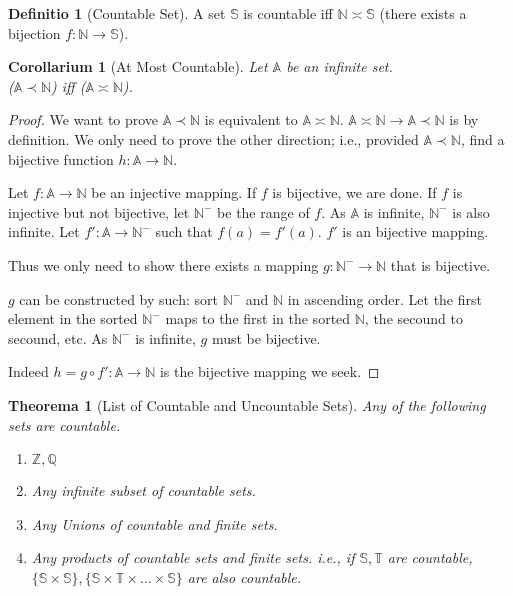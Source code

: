 \documentclass[12pt, a4paper]{report}
\newtheorem{theorem}{Theorema}[section]
\newtheorem{corollary}{Corollarium}[section]
\theoremstyle{definition}
\newtheorem{definition}{Definitio}[section]
\theoremstyle{definition}
\theoremstyle{remark}
\begin{document}
\begin{definition}[Countable Set]
	A set $\mathbb{S}$ is countable iff $\mathbb{N} \asymp \mathbb{S}$ (there exists a bijection $f:\mathbb{N} \rightarrow \mathbb{S}$).
\end{definition}

\begin{corollary}[At Most Countable]
	Let $\mathbb{A}$ be an infinite set. \\($\mathbb{A} \prec \mathbb{N}$) iff ($\mathbb{A} \asymp \mathbb{N}$).
\end{corollary}

\begin{proof}
	We want to prove $\mathbb{A} \prec \mathbb{N}$ is equivalent to $\mathbb{A} \asymp \mathbb{N}$. $\mathbb{A} \asymp \mathbb{N} \rightarrow \mathbb{A} \prec \mathbb{N}$ is by definition. 
	We only need to prove the other direction; i.e., provided $\mathbb{A} \prec \mathbb{N}$, find a bijective function $h: \mathbb{A} \rightarrow \mathbb{N}$.

	Let $f: \mathbb{A} \rightarrow \mathbb{N}$ be an injective mapping. If $f$ is bijective, we are done. If $f$ is injective but not bijective, let $\mathbb{N}^-$ be the range of $f.$ As $\mathbb{A}$ is infinite, $\mathbb{N}^-$ is also infinite.  
	Let $f': \mathbb{A} \rightarrow \mathbb{N}^-$ such that $f(a) = f'(a).$ $f'$ is an bijective mapping. 
	
    Thus we only need to show there exists a mapping $g: \mathbb{N}^- \rightarrow \mathbb{N}$ that is bijective. 

	$g$ can be constructed by such: sort $\mathbb{N}^-$ and $\mathbb{N}$ in ascending order. Let the first element in the sorted $\mathbb{N}^-$ maps to the first in the sorted $\mathbb{N}$, the secound to secound, etc.
	As $\mathbb{N}^-$ is infinite, $g$ must be bijective.

	Indeed $h = g \circ f': \mathbb{A} \rightarrow \mathbb{N}$ is the bijective mapping we seek. 
\end{proof}

\begin{theorem}[List of Countable and Uncountable Sets]
	Any of the following sets are countable.
	\begin{enumerate}
		\item $\mathbb{Z}, \mathbb{Q}$ 
		\item Any infinite subset of countable sets.
		\item Any Unions of countable and finite sets.
		\item Any products of countable sets and finite sets. i.e., if $\mathbb{S}, \mathbb{T}$ are countable, $\{\mathbb{S}\times \mathbb{S}\}, \{\mathbb{S}\times \mathbb{T}\times \dots \times \mathbb{S} \}$ are also countable.
	\end{enumerate}
\end{theorem}
\end{document}
